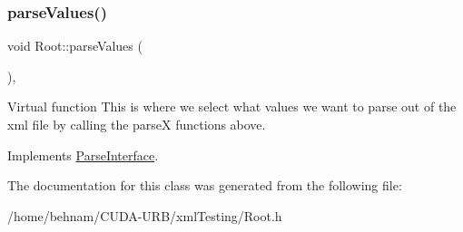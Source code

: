 \subsubsection{\texorpdfstring{parse\+Values()}{parseValues()}\hspace{0.1cm}{\footnotesize\ttfamily [2/2]}}
{\footnotesize\ttfamily void Root\+::parse\+Values (\begin{DoxyParamCaption}{ }\end{DoxyParamCaption})\hspace{0.3cm}{\ttfamily [inline]}, {\ttfamily [virtual]}}

Virtual function This is where we select what values we want to parse out of the xml file by calling the parseX functions above. 

Implements \hyperlink{classParseInterface_afca32108192ba0997c9e5a78189b0cbc}{Parse\+Interface}.



The documentation for this class was generated from the following file\+:\begin{DoxyCompactItemize}
\item 
/home/behnam/\+C\+U\+D\+A-\/\+U\+R\+B/xml\+Testing/Root.\+h\end{DoxyCompactItemize}
